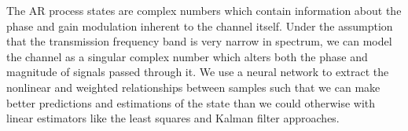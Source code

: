 \documentclass[twocolumn,letterpaper]{IEEEAerospaceCLS}  %
\begin{document}
                               
                               
                               
                               
The AR process states are complex numbers which contain information about the phase and gain modulation inherent to the channel itself. Under the assumption that the transmission frequency band is very narrow in spectrum, we can model the channel as a singular complex number which alters both the phase and magnitude of signals passed through it. We use a neural network to extract the nonlinear and weighted relationships between samples such that we can make better predictions and estimations of the state than we could otherwise with linear estimators like the least squares and Kalman filter approaches. 


\end{document}
